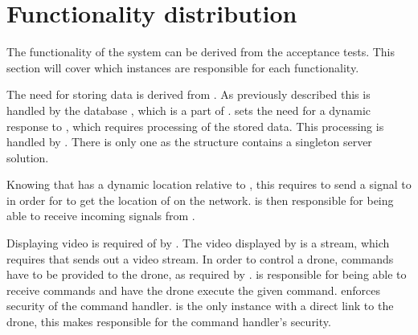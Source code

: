 \section{Functionality distribution}
\label{sec:functionality_distribution}

The functionality of the system can be derived from the acceptance tests.
This section will cover which instances are responsible for each functionality.

The need for storing data is derived from .
As previously described this is handled by the database , which is a part of .
 sets the need for a dynamic response to , which requires processing of the stored data.
This processing is handled by .
There is only one  as the structure contains a singleton server solution.

Knowing that  has a dynamic location relative to , this requires  to send a signal to  in order for  to get the location of  on the network.
 is then responsible for being able to receive incoming signals from .

Displaying video is required of  by .
The video displayed by  is a stream, which requires that  sends out a video stream.
In order to control a drone, commands have to be provided to the drone, as required by .
 is responsible for being able to receive commands and have the drone execute the given command.
 enforces security of the command handler.
 is the only instance with a direct link to the drone, this makes  responsible for the command handler's security.





